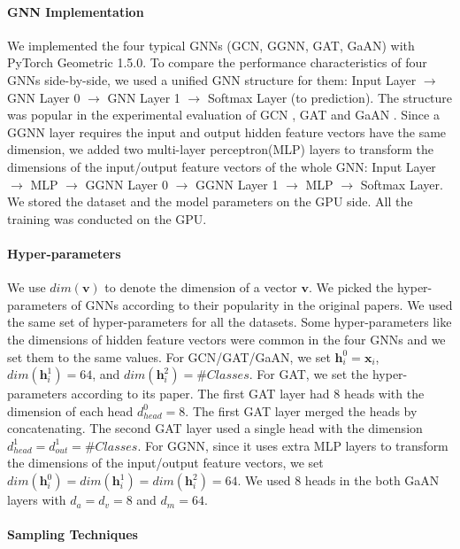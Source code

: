 \paragraph{GNN Implementation}
We implemented the four typical GNNs (GCN, GGNN, GAT, GaAN) with PyTorch Geometric 1.5.0.
To compare the performance characteristics of four GNNs side-by-side, we used a unified GNN structure for them: Input Layer $\rightarrow$ GNN Layer 0 $\rightarrow$ GNN Layer 1 $\rightarrow$ Softmax Layer (to prediction).
The structure was popular in the experimental evaluation of GCN \cite{kipf2017_gcn}, GAT \cite{huang2018_gat} and GaAN \cite{zhang2018_gaan}.
Since a GGNN layer requires the input and output hidden feature vectors have the same dimension, we added two multi-layer perceptron(MLP) layers to transform the dimensions of the input/output feature vectors of the whole GNN: Input Layer $\rightarrow$ MLP $\rightarrow$ GGNN Layer 0 $\rightarrow$ GGNN Layer 1 $\rightarrow$ MLP $\rightarrow$ Softmax Layer.
We stored the dataset and the model parameters on the GPU side.
All the training was conducted on the GPU.

\paragraph{Hyper-parameters}
We use $dim(\boldsymbol{v})$ to denote the dimension of a vector $\boldsymbol{v}$.
We picked the hyper-parameters of GNNs according to their popularity in the original papers.
We used the same set of hyper-parameters for all the datasets. 
Some hyper-parameters like the dimensions of hidden feature vectors were common in the four GNNs and we set them to the same values.
For GCN/GAT/GaAN, we set $\boldsymbol{h}^0_i = \boldsymbol{x}_i$, $dim(\boldsymbol{h}^1_i)=64$, and $dim(\boldsymbol{h}^2_i)=\#Classes$.
For GAT, we set the hyper-parameters according to its paper\cite{huang2018_gat}.
The first GAT layer had 8 heads with the dimension of each head $d^0_{head}=8$. The first GAT layer merged the heads by concatenating.
The second GAT layer used a single head with the dimension $d^1_{head}=d^1_{out}=\#Classes$.
For GGNN, since it uses extra MLP layers to transform the dimensions of the input/output feature vectors, we set $dim(\boldsymbol{h}^0_i) = dim(\boldsymbol{h}^1_i) = dim(\boldsymbol{h}^2_i) = 64$.
We used 8 heads in the both GaAN layers with $d_a=d_v=8$ and $d_m=64$.

\paragraph{Sampling Techniques}

